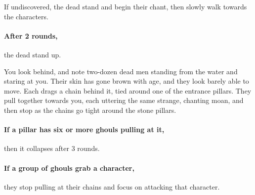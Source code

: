 If undiscovered, the dead stand and begin their chant, then slowly walk towards the characters.

\paragraph{After 2 rounds,}
the dead stand up.

\begin{boxtext}
  You look behind, and note two-dozen dead men standing from the water and staring at you.
  Their skin has gone brown with age, and they look barely able to move.
  Each drags a chain behind it, tied around one of the entrance pillars.
  They pull together towards you, each uttering the same strange, chanting moan, and then stop as the chains go tight around the stone pillars.
\end{boxtext}

\paragraph{If a pillar has six or more ghouls pulling at it,}
then it collapses after 3 rounds.

\paragraph{If a group of ghouls grab a character,}
they stop pulling at their chains and focus on attacking that character.
